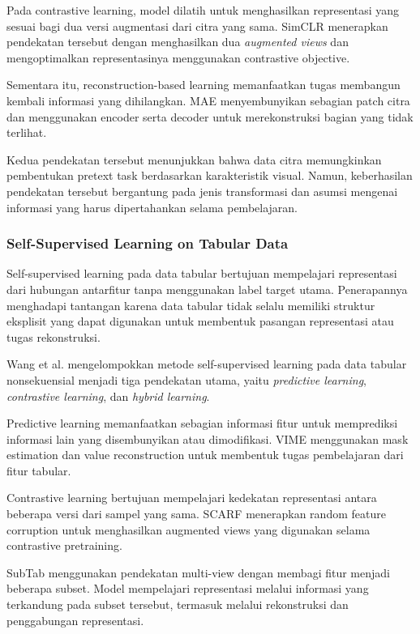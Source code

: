 Pada contrastive learning, model dilatih untuk menghasilkan representasi yang sesuai bagi dua versi augmentasi dari citra yang sama. SimCLR \cite{ref2} menerapkan pendekatan tersebut dengan menghasilkan dua \textit{augmented views} dan mengoptimalkan representasinya menggunakan contrastive objective.

Sementara itu, reconstruction-based learning memanfaatkan tugas membangun kembali informasi yang dihilangkan. MAE \cite{ref3} menyembunyikan sebagian patch citra dan menggunakan encoder serta decoder untuk merekonstruksi bagian yang tidak terlihat.

Kedua pendekatan tersebut menunjukkan bahwa data citra memungkinkan pembentukan pretext task berdasarkan karakteristik visual. Namun, keberhasilan pendekatan tersebut bergantung pada jenis transformasi dan asumsi mengenai informasi yang harus dipertahankan selama pembelajaran.

\subsubsection{Self-Supervised Learning on Tabular Data}

Self-supervised learning pada data tabular bertujuan mempelajari representasi dari hubungan antarfitur tanpa menggunakan label target utama. Penerapannya menghadapi tantangan karena data tabular tidak selalu memiliki struktur eksplisit yang dapat digunakan untuk membentuk pasangan representasi atau tugas rekonstruksi.

Wang et al. \cite{ref4} mengelompokkan metode self-supervised learning pada data tabular nonsekuensial menjadi tiga pendekatan utama, yaitu \textit{predictive learning}, \textit{contrastive learning}, dan \textit{hybrid learning}.

Predictive learning memanfaatkan sebagian informasi fitur untuk memprediksi informasi lain yang disembunyikan atau dimodifikasi. VIME \cite{ref5} menggunakan mask estimation dan value reconstruction untuk membentuk tugas pembelajaran dari fitur tabular.

Contrastive learning bertujuan mempelajari kedekatan representasi antara beberapa versi dari sampel yang sama. SCARF \cite{ref7} menerapkan random feature corruption untuk menghasilkan augmented views yang digunakan selama contrastive pretraining.

SubTab \cite{ref6} menggunakan pendekatan multi-view dengan membagi fitur menjadi beberapa subset. Model mempelajari representasi melalui informasi yang terkandung pada subset tersebut, termasuk melalui rekonstruksi dan penggabungan representasi.

